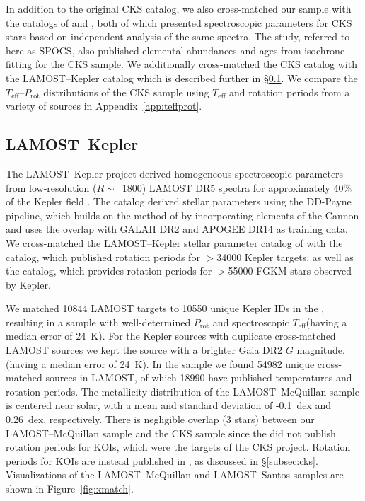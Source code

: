 \documentclass[linenumbers,tighten,trackchanges,twocolumn]{aastex631}
\newcommand{\lamostmcq}{LAMOST--McQuillan\xspace}
\newcommand{\lamostsan}{LAMOST--Santos\xspace}
\newcommand{\teff}{\ensuremath{T_{\mathrm{eff}}}\xspace}
\newcommand{\prot}{\ensuremath{P_\mathrm{rot}}\xspace}
\begin{document}
In addition to the original CKS catalog, we also cross-matched our sample with the catalogs of \citet{Brewer2018} and \citet{Martinez2019}, both of which presented spectroscopic parameters for CKS stars based on independent analysis of the same spectra. The \citet{Brewer2018} study, referred to here as SPOCS, also published elemental abundances and ages from isochrone fitting for the CKS sample. We additionally cross-matched the CKS catalog with the LAMOST--Kepler catalog \citep{Xiang2019} which is described further in \S\ref{subsec:lamost}. We compare the \teff--\prot distributions of the CKS sample using \teff and rotation periods from a variety of sources in Appendix~\ref{app:teffprot}.

\subsection{LAMOST--Kepler} \label{subsec:lamost}
The LAMOST--Kepler project derived homogeneous spectroscopic parameters from low-resolution ($R\sim$~1800) LAMOST DR5 spectra for approximately 40\% of the Kepler field \citep{Zong2018, Xiang2019}. The \citet{Xiang2019} catalog derived stellar parameters using the DD-Payne pipeline, which builds on the method of \citet{Ting2017b} by incorporating elements of the Cannon \citep{Ness2015} and uses the overlap with GALAH DR2 and APOGEE DR14 as training data. We cross-matched the LAMOST--Kepler stellar parameter catalog of \citet{Xiang2019} with the \citet{McQuillan2014} catalog, which published rotation periods for $>$34000 Kepler targets, {\color{red} as well as the \citet{Santos2021} catalog, which provides rotation periods for $>$55000 FGKM stars observed by Kepler.}

We matched 10844 LAMOST targets to 10550 unique Kepler IDs in the \citet{McQuillan2014}, resulting in a sample with well-determined \prot and spectroscopic \teff (having a median error of 24~K). For the Kepler sources with duplicate cross-matched LAMOST sources we kept the source with a brighter Gaia DR2 $G$ magnitude. (having a median error of 24~K). In the \citet{Santos2021} sample we found 54982 unique cross-matched sources in LAMOST, of which 18990 have published temperatures and rotation periods. The metallicity distribution of the LAMOST--McQuillan sample is centered near solar, with a mean and standard deviation of -0.1~dex and 0.26~dex, respectively. There is negligible overlap (3 stars) between our LAMOST--McQuillan sample and the CKS sample since the \citet{McQuillan2014} did not publish rotation periods for KOIs, which were the targets of the CKS project. Rotation periods for KOIs are instead published in \citet{McQuillan2013}, as discussed in \S\ref{subsec:cks}. Visualizations of the \lamostmcq and \lamostsan samples are shown in Figure~\ref{fig:xmatch}.
\end{document}
